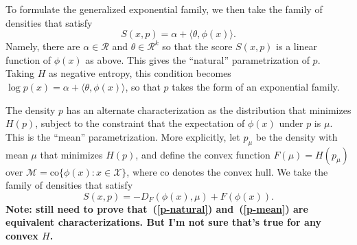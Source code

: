\documentclass[10pt,letterpaper]{article}
\newcommand{\X}{\ensuremath{\mathcal{X}}}
\newcommand{\R}{\ensuremath{\mathcal{R}}}
\newcommand{\mM}{\ensuremath{\mathcal{M}}}
\newcommand{\ip}[2]{\ensuremath{\langle #1, #2 \rangle}}
\newcommand{\co}{\mbox{co}}
\begin{document}
To formulate the generalized exponential family, we then take the family of densities that satisfy
%
\begin{equation} \label{p-natural}
S(x,p) = \alpha + \ip{\theta}{\phi(x)}.
\end{equation}
%
Namely, there are $\alpha \in \R$ and $\theta \in \R^k$ so that the score $S(x,p)$ is a linear function of $\phi(x)$ as above. This gives the ``natural'' parametrization of $p$. Taking $H$ as negative entropy, this condition becomes $\log p(x) = \alpha + \ip{\theta}{\phi(x)}$, so that $p$ takes the form of an exponential family.

The density $p$ has an alternate characterization as the distribution that minimizes $H(p)$, subject to the constraint that the expectation of $\phi(x)$ under $p$ is $\mu$. This is the ``mean'' parametrization. More explicitly, let $p_\mu$ be the density with mean $\mu$ that minimizes $H(p)$, and define the convex function $F(\mu) = H(p_{\mu})$ over $\mM = \co\{\phi(x) : x \in \X\}$, where $\co$ denotes the convex hull. We take the family of densities that satisfy
%
\begin{equation} \label{p-mean}
S(x,p) = -D_F(\phi(x), \mu) + F(\phi(x)).
\end{equation}
%
{\bf Note: still need to prove that~(\ref{p-natural}) and~(\ref{p-mean}) are equivalent characterizations. But I'm not sure that's true for any convex $H$.}

\end{document}
